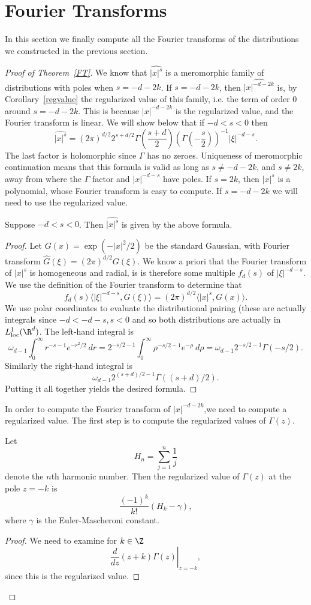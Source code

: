 \documentclass[12pt]{article}
\begin{document}
\section{Fourier Transforms}
In this section we finally compute all the Fourier transforms of the distributions we constructed in the previous section. 
\begin{proof}[Proof of Theorem~\ref{FT}]
We know that $\widehat{|x|^s}$ is a meromorphic family of distributions with poles when $s = -d-2k$. If $s = -d-2k$, then $\widehat{|x|^{-d-2k}}$ is, by Corollary~\ref{regvalue} the regularized value of this family, i.e. the term of order $0$ around $s=-d-2k$. This is because $|x|^{-d-2k}$ is the regularized value, and the Fourier transform is linear. We will show below that if $-d < s < 0$ then
\[\widehat{|x|^s} = (2\pi)^{d/2}2^{s+d/2}\Gamma\left(\frac{s+d}{2}\right)\left(\Gamma\left(-\frac{s}{2}\right)\right)^{-1}|\xi|^{-d-s}.\]
The last factor is holomorphic since $\Gamma$ has no zeroes. Uniqueness of meromorphic continuation means that this formula is valid as long as $s \neq -d-2k$, and $s \neq 2k$, away from where the $\Gamma$ factor and $|x|^{-d-s}$ have poles. If $s = 2k$, then $|x|^{s}$ is a polynomial, whose Fourier transform is easy to compute. If $s = -d-2k$ we will need to use the regularized value.

\begin{lem}Suppose $-d < s < 0$. Then $\widehat{|x|^s}$ is given by the above formula.\end{lem}
\begin{proof}
Let $G(x) = \exp(-|x|^2/2)$ be the standard Gaussian, with Fourier transform $\widehat{G}(\xi) = (2\pi)^{d/2}G(\xi)$. We know a priori that the Fourier transform of $|x|^{s}$ is homogeneous and radial, is is therefore some multiple $f_d(s)$ of $|\xi|^{-d-s}$. We use the definition of the Fourier transform to determine that
\[f_d(s)\langle |\xi|^{-d-s},G(\xi)\rangle = (2\pi)^{d/2}\langle |x|^{s},G(x)\rangle.\]
We use polar coordinates to evaluate the distributional pairing (these are actually integrals since $-d < -d-s,s < 0$ and so both distributions are actually in $L^1_{\text{loc}}(\R^d)$. The left-hand integral is
\[\omega_{d-1}\int_0^\infty r^{-s-1}e^{-r^2/2}\ dr = 2^{-s/2-1}\int_0^\infty \rho^{-s/2-1}e^{-\rho}\ d\rho = \omega_{d-1}2^{-s/2-1}\Gamma(-s/2).\]
Similarly the right-hand integral is
\[\omega_{d-1}2^{(s+d)/2-1}\Gamma((s+d)/2).\] Putting it all together yields the desired formula.\end{proof}


In order to compute the Fourier transform of $|x|^{-d-2k}$,we need to compute a regularized value. The first step is to compute the regularized values of $\Gamma(z)$.
\begin{prop}\label{regamma}Let
\[H_n = \sum_{j=1}^n \frac{1}{j}\] denote the $n$th harmonic number. Then the regularized value of $\Gamma(z)$ at the pole $z=-k$ is
\[\frac{(-1)^k}{k!}(H_k-\gamma),\]
where $\gamma$ is the Euler-Mascheroni constant.\end{prop}
\begin{proof}
We need to examine for $k \in \Z$
\[\left.\frac{d}{dz} (z+k)\Gamma(z)\right|_{z=-k},\] since this is the regularized value.


\end{proof}
\end{proof}
\end{document}
